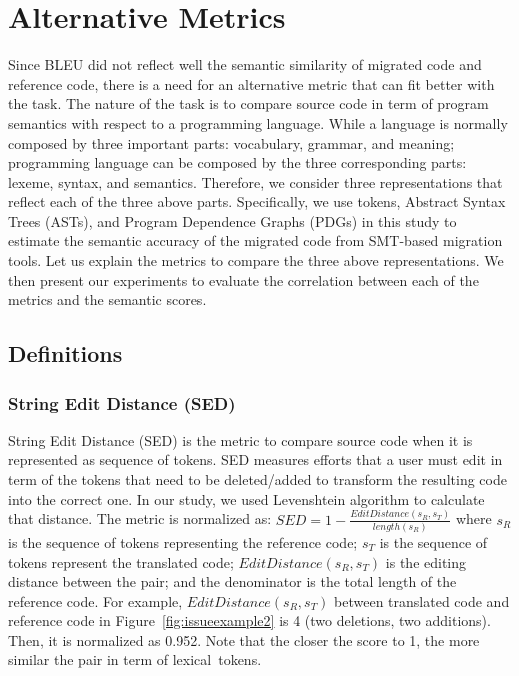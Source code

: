 \section{Alternative Metrics}

Since BLEU did not reflect well the semantic similarity of migrated
code and reference code, there is a need for an alternative metric
that can fit better with the task. The nature of the task is to
compare source code in term of program semantics with respect to a
programming language.
%
While a language is normally composed by three important parts:
vocabulary, grammar, and meaning; programming language can be composed
by the three corresponding parts: lexeme, syntax, and
semantics. 
%
Therefore, we consider three representations that reflect each of the
three above parts. Specifically, we use tokens, Abstract Syntax Trees
(ASTs), and Program Dependence Graphs (PDGs) in this study to estimate
the semantic accuracy of the migrated code from SMT-based migration
tools.
%
Let us explain the metrics to compare the three above representations.
%
We then present our experiments to evaluate the correlation between
each of the metrics and the semantic scores.


\subsection{Definitions}

\subsubsection{\textbf{String Edit Distance (SED)}}
String Edit Distance (SED) is the metric to compare source code when
it is represented as sequence of tokens. SED measures efforts that a
user must edit in term of the tokens that need to be deleted/added to
transform the resulting code into the correct one. In our study, we
used Levenshtein algorithm to calculate that distance. The metric is
normalized as: $SED = 1 - \frac{EditDistance\left(s_R,
  s_T\right)}{length\left(s_R\right)}$ where $s_R$ is the sequence of
tokens representing the reference code; $s_T$ is the sequence of
tokens represent the translated code; $EditDistance\left(s_R,
s_T\right)$ is the editing distance between the pair; and the
denominator is the total length of the reference code. For example,
$EditDistance\left(s_R, s_T\right)$ between translated code and
reference code in Figure~\ref{fig:issueexample2} is 4 (two deletions,
two additions). Then, it is normalized as 0.952. Note that the closer
the score to 1, the more similar the pair in term of lexical~tokens.




 


